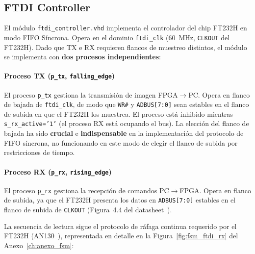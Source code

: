 \documentclass[../main.tex]{subfiles}
\begin{document}
\subsection{FTDI Controller}
\label{sec:ftdi_controller}

El módulo \texttt{ftdi\_controller.vhd} implementa el controlador del chip FT232H en modo FIFO Síncrona. Opera en el dominio \texttt{ftdi\_clk} (60~MHz, \texttt{CLKOUT} del FT232H). Dado que TX e RX requieren flancos de muestreo distintos, el módulo se implementa con \textbf{dos procesos independientes}:

\paragraph{Proceso TX (\texttt{p\_tx}, \texttt{falling\_edge})}

El proceso \texttt{p\_tx} gestiona la transmisión de imagen FPGA$\rightarrow$PC. Opera en flanco de bajada de \texttt{ftdi\_clk}, de modo que \texttt{WR\#} y \texttt{ADBUS[7:0]} sean estables en el flanco de subida en que el FT232H los muestrea. El proceso está inhibido mientras \texttt{s\_rx\_active='1'} (el proceso RX está ocupando el bus). La elección del flanco de bajada ha sido \textbf{crucial} e \textbf{indispensable} en la implementación del protocolo de FIFO síncrona, no funcionando en este modo de elegir el flanco de subida por restricciones de tiempo.

\paragraph{Proceso RX (\texttt{p\_rx}, \texttt{rising\_edge})}

El proceso \texttt{p\_rx} gestiona la recepción de comandos PC$\rightarrow$FPGA. Opera en flanco de subida, ya que el FT232H presenta los datos en \texttt{ADBUS[7:0]} estables en el flanco de subida de \texttt{CLKOUT} (Figura~4.4 del datasheet~\cite{ft232h_datasheet}).

La secuencia de lectura sigue el protocolo de ráfaga continua requerido por el FT232H (AN130~\cite{ft232h_an130}), representada en detalle en la Figura~\ref{fig:fsm_ftdi_rx} del Anexo~\ref{ch:anexo_fsm}:
\end{document}

